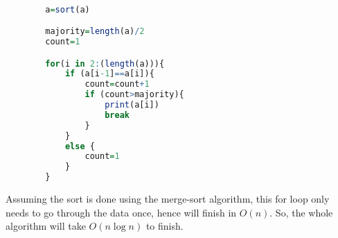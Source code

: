     \begin{lstlisting}[language=R,label=lst:majority]

        a=sort(a)

        majority=length(a)/2
        count=1

        for(i in 2:(length(a))){
            if (a[i-1]==a[i]){
                count=count+1
                if (count>majority){
                    print(a[i])
                    break
                }
            }
            else {
                count=1
            }
        }
    \end{lstlisting}

    Assuming the sort is done using the merge-sort algorithm, this for loop only needs to go through the data once,
    hence will finish in $O(n)$. So, the whole algorithm will take $O(n\log{n})$ to finish.\newline



